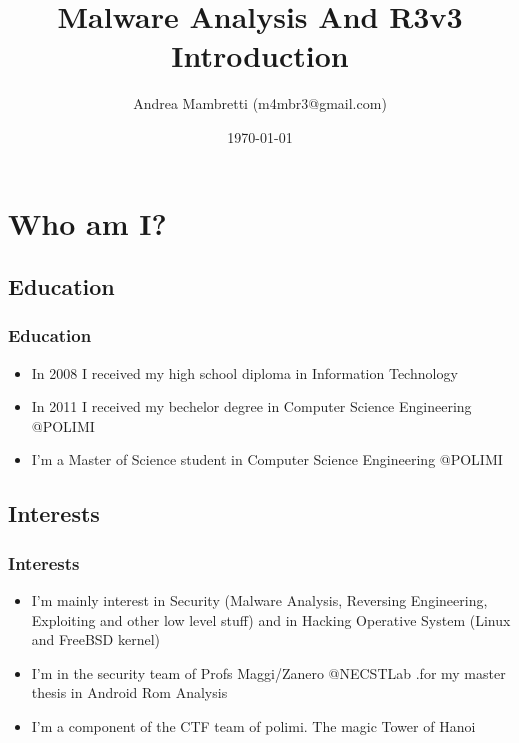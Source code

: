 \documentclass[]{beamer}
\title{Malware Analysis And R3v3 Introduction}    %
\author{Andrea Mambretti (m4mbr3@gmail.com)}        %
\institute{Politecnico di Milano}      %
\date{\today}                    %
\begin{document}
\begin{frame}
  \titlepage
\end{frame}

\section[Outline]{}

\begin{frame}
  \tableofcontents
\end{frame}

\section {Who am I?}
	\subsection {Education}
		\begin{frame}
			\frametitle{Education}
			\begin{itemize}
				\item { In 2008 I received my high school diploma in Information Technology} 
				\item { In 2011 I received my bechelor degree in Computer Science Engineering @POLIMI}
				\item { I'm a Master of Science student in Computer Science Engineering @POLIMI}
			\end{itemize}
		\end{frame}
	\subsection {Interests}
		\begin{frame}
			\frametitle{Interests}
			\begin{itemize}
				\item { I'm mainly interest in Security (Malware Analysis, Reversing Engineering, Exploiting and other low level stuff) and in Hacking Operative System (Linux and FreeBSD kernel)}
				\item { I'm in the security team of Profs Maggi/Zanero @NECSTLab .for my master thesis in Android Rom Analysis }
				\item { I'm a component of the CTF team of polimi. The magic Tower of Hanoi}  
			\end{itemize}
		\end{frame}
\end{document}
